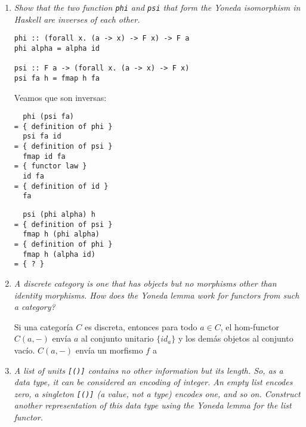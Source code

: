 \documentclass[11pt]{article}
\begin{document}
\begin{enumerate}
\item \textit{Show that the two function \texttt{phi} and \texttt{psi} that form the Yoneda isomorphism in Haskell are inverses of each other.}

\begin{verbatim}
phi :: (forall x. (a -> x) -> F x) -> F a
phi alpha = alpha id

psi :: F a -> (forall x. (a -> x) -> F x)
psi fa h = fmap h fa
\end{verbatim}

Veamos que son inversas:

\begin{verbatim}
  phi (psi fa)
= { definition of phi }
  psi fa id
= { definition of psi }
  fmap id fa
= { functor law }
  id fa
= { definition of id }
  fa
\end{verbatim}

\begin{verbatim}
  psi (phi alpha) h
= { definition of psi }
  fmap h (phi alpha)
= { definition of phi }
  fmap h (alpha id)
= { ? }
\end{verbatim}

\item \textit{A discrete category is one that has objects but no morphisms other than identity morphisms. How does the Yoneda lemma work for functors from such a category?}

Si una categoría $C$ es discreta, entonces para todo $a \in C$, el hom-functor $C(a,-)$ envía $a$ al conjunto unitario $\{id_a\}$ y los demás objetos al conjunto vacío. $C(a,-)$ envía un morfismo $f$ a 

\item \textit{A list of units \texttt{[()]} contains no other information but its length. So, as a data type, it can be considered an encoding of integer. An empty list encodes zero, a singleton \texttt{[()]} (a value, not a type) encodes one, and so on. Construct another representation of this data type using the Yoneda lemma for the list functor.}
\end{enumerate}
\end{document}
